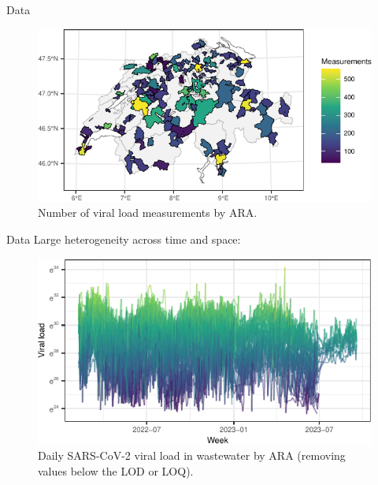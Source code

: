 \documentclass[
  ignorenonframetext,
]{beamer}
\begin{document}
\begin{frame}{Data}
\protect\hypertarget{data-3}{}
\begin{figure}
\centering
\includegraphics{2023-11-07_pres_files/figure-beamer/data_mis2-1.pdf}
\caption{Number of viral load measurements by ARA.}
\end{figure}
\end{frame}

\begin{frame}{Data}
\protect\hypertarget{data-4}{}
Large \alert{heterogeneity} across time and space:

\begin{figure}
\centering
\includegraphics{2023-11-07_pres_files/figure-beamer/data_vl1-1.pdf}
\caption{Daily SARS-CoV-2 viral load in wastewater by ARA (removing
values below the LOD or LOQ).}
\end{figure}
\end{frame}
\end{document}
